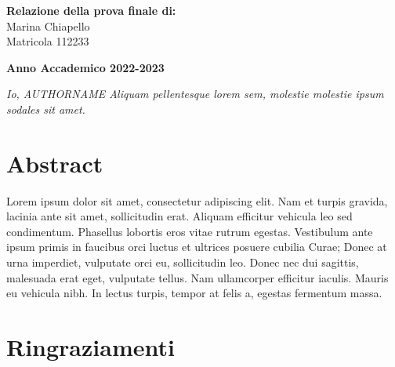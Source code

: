 \documentclass[12pt,it,a4paper,]{report}
\begin{document}
\begin{titlepage}
        \begin{flushright}
            {\large \textbf{Relazione della prova finale di:}} \\
            \large{Marina Chiapello} \\
            \large{Matricola 112233} 
        \end{flushright}
        
        \vspace{15mm}
        \begin{center}
            {\large{\bf Anno Accademico 2022-2023}}
        \end{center}

        \restoregeometry
        
    \end{titlepage}




\vspace*{\fill}

\noindent \textit{
Io, AUTHORNAME Aliquam pellentesque lorem sem, molestie molestie ipsum sodales sit amet.
} \vspace*{\fill}  \newpage

\hypertarget{abstract}{%
\chapter*{Abstract}\label{abstract}}

Lorem ipsum dolor sit amet, consectetur adipiscing elit. Nam et turpis
gravida, lacinia ante sit amet, sollicitudin erat. Aliquam efficitur
vehicula leo sed condimentum. Phasellus lobortis eros vitae rutrum
egestas. Vestibulum ante ipsum primis in faucibus orci luctus et
ultrices posuere cubilia Curae; Donec at urna imperdiet, vulputate orci
eu, sollicitudin leo. Donec nec dui sagittis, malesuada erat eget,
vulputate tellus. Nam ullamcorper efficitur iaculis. Mauris eu vehicula
nibh. In lectus turpis, tempor at felis a, egestas fermentum massa.

\setcounter{page}{1}

\hypertarget{ringraziamenti}{%
\chapter*{Ringraziamenti}\label{ringraziamenti}}
\end{document}
